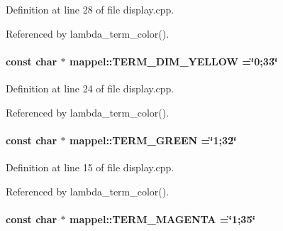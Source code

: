 Definition at line 28 of file display.\+cpp.



Referenced by lambda\+\_\+term\+\_\+color().

\paragraph[{\texorpdfstring{T\+E\+R\+M\+\_\+\+D\+I\+M\+\_\+\+Y\+E\+L\+L\+OW}{TERM_DIM_YELLOW}}]{\setlength{\rightskip}{0pt plus 5cm}const char $\ast$ mappel\+::\+T\+E\+R\+M\+\_\+\+D\+I\+M\+\_\+\+Y\+E\+L\+L\+OW =\char`\"{}0;33\char`\"{}}\hypertarget{namespacemappel_af34f15f5200f5711a39b0dd715907f61}{}\label{namespacemappel_af34f15f5200f5711a39b0dd715907f61}


Definition at line 24 of file display.\+cpp.



Referenced by lambda\+\_\+term\+\_\+color().

\paragraph[{\texorpdfstring{T\+E\+R\+M\+\_\+\+G\+R\+E\+EN}{TERM_GREEN}}]{\setlength{\rightskip}{0pt plus 5cm}const char $\ast$ mappel\+::\+T\+E\+R\+M\+\_\+\+G\+R\+E\+EN =\char`\"{}1;32\char`\"{}}\hypertarget{namespacemappel_a7beb463b118be1cd8c591eaf053d7f5c}{}\label{namespacemappel_a7beb463b118be1cd8c591eaf053d7f5c}


Definition at line 15 of file display.\+cpp.



Referenced by lambda\+\_\+term\+\_\+color().

\paragraph[{\texorpdfstring{T\+E\+R\+M\+\_\+\+M\+A\+G\+E\+N\+TA}{TERM_MAGENTA}}]{\setlength{\rightskip}{0pt plus 5cm}const char $\ast$ mappel\+::\+T\+E\+R\+M\+\_\+\+M\+A\+G\+E\+N\+TA =\char`\"{}1;35\char`\"{}}\hypertarget{namespacemappel_a2b80f7559dbf8fd1650220f75db541b2}{}\label{namespacemappel_a2b80f7559dbf8fd1650220f75db541b2}


